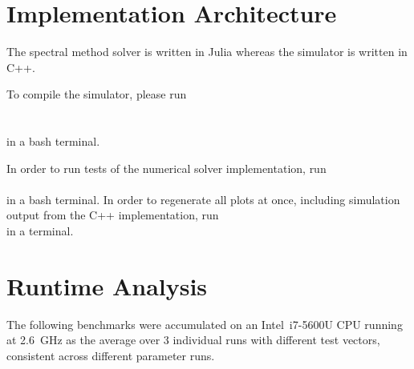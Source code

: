 \section{Implementation Architecture}
The spectral method solver is written in Julia \parencite{2017-julia} whereas the simulator is written in C++.

To compile the simulator, please run \\
 \\
 \\
in a bash terminal.

In order to run tests of the numerical solver implementation, run \\
 \\
in a bash terminal. In order to regenerate all plots at once, including simulation output from the C++ implementation, run \\
in a terminal.

\hierKoennteIhreWerbungStehen

\section{Runtime Analysis}
\label{sec:runtime-analysis}
The following benchmarks were accumulated on an Intel\textregistered \, i7-5600U CPU running at \SI{2.6}{\giga\hertz} as the average over 3 individual runs with different test vectors, consistent across different parameter runs.
\hierKoennteIhreWerbungStehen
